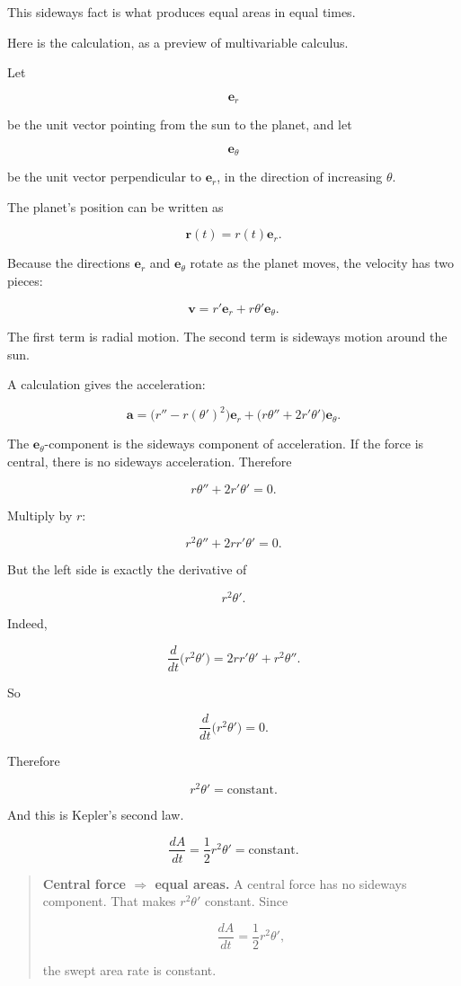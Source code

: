 This sideways fact is what produces equal areas in equal times.

Here is the calculation, as a preview of multivariable calculus.

Let

\[
\mathbf e_r
\]

be the unit vector pointing from the sun to the planet, and let

\[
\mathbf e_\theta
\]

be the unit vector perpendicular to \(\mathbf e_r\), in the direction of increasing
\(\theta\).

The planet's position can be written as

\[
\mathbf r(t)=r(t)\mathbf e_r.
\]

Because the directions \(\mathbf e_r\) and \(\mathbf e_\theta\) rotate as the planet moves,
the velocity has two pieces:

\[
\mathbf v
=
r'\mathbf e_r+r\theta'\mathbf e_\theta.
\]

The first term is radial motion.  The second term is sideways motion around the sun.

A calculation gives the acceleration:

\[
\mathbf a
=
\bigl(r''-r(\theta')^2\bigr)\mathbf e_r
+
\bigl(r\theta''+2r'\theta'\bigr)\mathbf e_\theta.
\]

The \(\mathbf e_\theta\)-component is the sideways component of acceleration.  If the
force is central, there is no sideways acceleration.  Therefore

\[
r\theta''+2r'\theta'=0.
\]

Multiply by \(r\):

\[
r^2\theta''+2rr'\theta'=0.
\]

But the left side is exactly the derivative of

\[
r^2\theta'.
\]

Indeed,

\[
\frac{d}{dt}\bigl(r^2\theta'\bigr)
=
2rr'\theta'+r^2\theta''.
\]

So

\[
\frac{d}{dt}\bigl(r^2\theta'\bigr)=0.
\]

Therefore

\[
\boxed{
r^2\theta'=\text{constant}.
}
\]

And this is Kepler's second law.

\[
\frac{dA}{dt}
=
\frac12 r^2\theta'
=
\text{constant}.
\]

\begin{quote}
\textbf{Central force \(\Longrightarrow\) equal areas.}
A central force has no sideways component.  That makes \(r^2\theta'\) constant.
Since

\[
\frac{dA}{dt}=\frac12 r^2\theta',
\]

the swept area rate is constant.
\end{quote}

